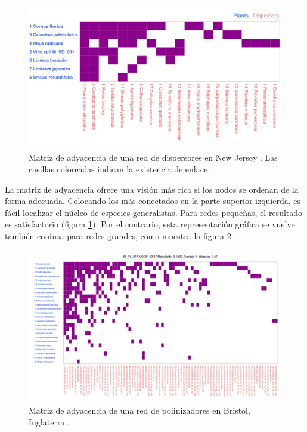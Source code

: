 \begin{figure}[h!]
\centering
\includegraphics[scale=0.1]{Figures/VIS_matrix_SD_001.png}
\caption{Matriz de adyacencia de una red de dispersores en New Jersey \cite{baird1980selection}. Las casillas coloreadas indican la existencia de enlace.}
\label{fig:VIS_matrix_SD_001}
\end{figure}

La matriz de adyacencia ofrece una visión más rica si los nodos se ordenan de la forma adecuada. Colocando los más conectados en la parte superior izquierda, es fácil localizar el núcleo de especies generalistas. Para redes pequeñas, el resultado es satisfactorio (figura \ref{fig:VIS_matrix_SD_001}). Por el contrario, esta representación gráfica se vuelve también confusa para redes grandes, como muestra la figura \ref{fig:VIS_matrix_PL_001}.

\begin{figure}[ht!]
\centering
\includegraphics[scale=0.45]{Figures/VIS_M_PL_017_matrix.png}
\caption{Matriz de adyacencia de una red de polinizadores en Bristol, Inglaterra \cite{memmott1999structure}.}
\label{fig:VIS_matrix_PL_001}
\end{figure}

